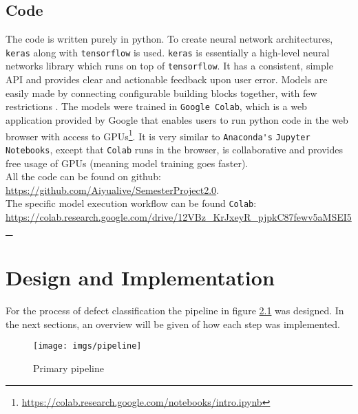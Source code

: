 \section{Code}
\label{int:sec:code}
The code is written purely in python. To create neural network architectures, \verb|keras| along with \verb|tensorflow| is used. \verb|keras| is essentially a high-level neural networks library which runs on top of \verb|tensorflow|. It has a consistent, simple API and provides clear and actionable feedback upon user error. Models are easily made by connecting configurable building blocks together, with few restrictions \cite{TensorFl31:online}. The models were trained in \verb|Google Colab|, which is a web application provided by Google that enables users to run python code in the web browser with access to GPUs\footnote{\url{https://colab.research.google.com/notebooks/intro.ipynb}}. It is very similar to \verb|Anaconda's| \verb|Jupyter Notebooks|, except that \verb|Colab| runs in the browser, is collaborative and provides free usage of GPUs (meaning model training goes faster).\\


\noindent All the code can be found on github: \\
\url{https://github.com/Aiyualive/SemesterProject2.0}.\\

\noindent The specific model execution workflow can be found \verb|Colab|:\\
\url{https://colab.research.google.com/drive/12VBz_KrJxeyR_pjpkC87fewv5aMSEI5_}



\chapter{Design and Implementation}
For the process of defect classification the pipeline in figure \ref{fig:pipeline} was designed. In the next sections, an overview will be given of how each step was implemented.
\begin{figure}[H]
	\centering
	\texttt{[image: imgs/pipeline]}
	\caption{Primary pipeline}
	\label{fig:pipeline}
\end{figure}


